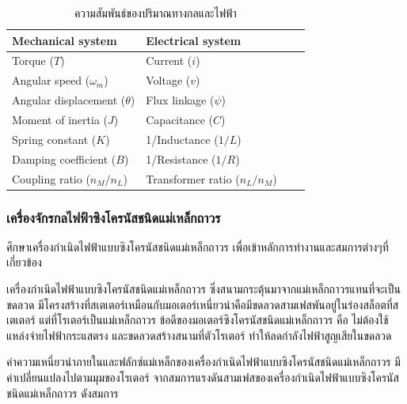 \documentclass[11pt,a4paper]{article}
\begin{document}
\begin{table}
    \centering
    \begin{tabular}{ | l | l | l | p{5cm} |}
        \hline
        \textbf{Mechanical system}      & \textbf{Electrical system}        \\ \hline
        Torque ($T$)                    & Current ($i$)                     \\ \hline
        Angular speed ($\omega_{m}$)    & Voltage ($v$)                     \\ \hline
        Angular displacement ($\theta$) & Flux linkage ($\psi$)             \\ \hline
        Moment of inertia ($J$)         & Capacitance ($C$)                 \\ \hline
        Spring constant ($K$)           & 1/Inductance ($1/L$)              \\ \hline
        Damping coefficient ($B$)       & 1/Resistance ($1/R$)              \\ \hline
        Coupling ratio ($n_{M}/n_{L}$)  & Transformer ratio ($n_{L}/n_{M}$) \\
        \hline
    \end{tabular}
    \caption{ความสัมพันธ์ของปริมาณทางกลและไฟฟ้า\cite{ElecDrive}}
\end{table}


\subsubsection{เครื่องจักรกลไฟฟ้าซิงโครนัสชนิดแม่เหล็กถาวร}
ศึกษาเครื่องกำเนิดไฟฟ้าแบบซิงโครนัสชนิดแม่เหล็กถาวร \cite{sswch4} \cite{PMSM} เพื่อเข้าหลักการทำงานและสมการต่างๆที่เกี่ยวข้อง

เครื่องกำเนิดไฟฟ้าแบบซิงโครนัสชนิดแม่เหล็กถาวร ซึ่งสนามกระตุ้นมาจากแม่เหล็กถาวรแทนที่จะเป็นขดลวด มีโครงสร้างที่สเตเตอร์เหมือนกับมอเตอร์เหนี่ยวนำคือมีขดลวดสามเฟสพันอยู่ในร่องสล็อตที่สเตเตอร์ แต่ที่โรเตอร์เป็นแม่เหล็กถาวร ข้อดีของมอเตอร์ซิงโครนัสชนิดแม่เหล็กถาวร คือ ไม่ต้องใช้แหล่งจ่ายไฟฟ้ากระแสตรง และขดลวดสร้างสนามที่ตัวโรเตอร์ ทำให้ลดกำลังไฟฟ้าสูญเสียในขดลวด

ค่าความเหนี่ยวนำภายในและฟลักซ์แม่เหล็กของเครื่องกำเนิดไฟฟ้าแบบซิงโครนัสชนิดแม่เหล็กถาวร มีค่าเปลี่ยนแปลงไปตามมุมของโรเตอร์ จากสมการแรงดันสามเฟสของเครื่องกำเนิดไฟฟ้าแบบซิงโครนัสชนิดแม่เหล็กถาวร ดังสมการ
\end{document}
